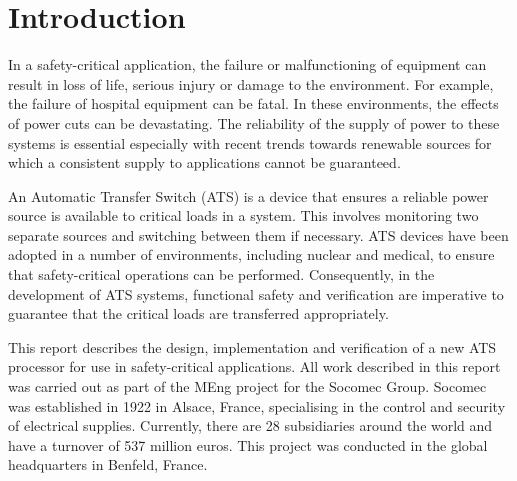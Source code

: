 \chapter{Introduction}
\label{introduction}

In a safety-critical application, the failure or malfunctioning of equipment can result in loss of life, serious injury or damage to the environment\cite{HayekSafety, Borcsok}. For example, the failure of hospital equipment can be fatal. In these environments, the effects of power cuts can be devastating\cite{azeem, onipede}. The reliability of the supply of power to these systems is essential especially with recent trends towards renewable sources for which a consistent supply to applications cannot be guaranteed\cite{liserre, onipede}.

An Automatic Transfer Switch (ATS) is a device that ensures a reliable power source is available to critical loads in a system\cite{azeem}. This involves monitoring two separate sources and switching between them if necessary. ATS devices have been adopted in a number of environments, including nuclear and medical, to ensure that safety-critical operations can be performed. Consequently, in the development of ATS systems, functional safety and verification are imperative to guarantee that the critical loads are transferred appropriately.

This report describes the design, implementation and verification of a new ATS processor for use in safety-critical applications. All work described in this report was carried out as part of the MEng project for the Socomec Group. Socomec was established in 1922 in Alsace, France, specialising in the control and security of electrical supplies. Currently, there are 28 subsidiaries around the world and have a turnover of 537 million euros. This project was conducted in the global headquarters in Benfeld, France.


